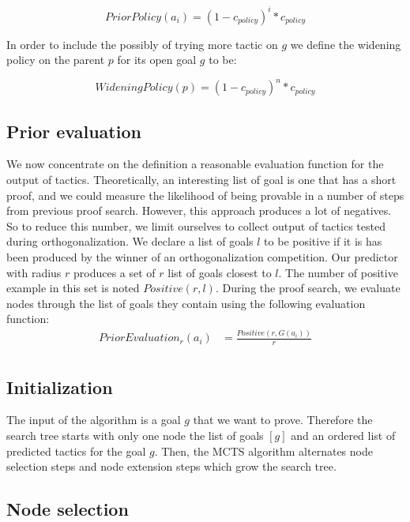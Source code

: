 \documentclass[runningheads,a4paper,draft]{svjour3}
\begin{document}
\[PriorPolicy(a_i) = (1 - c_{policy})^{i} * c_{policy}\]

In order to include the possibly of trying more tactic on $g$ we define the
widening policy on the parent $p$ for its open goal $g$ to be:

\[WideningPolicy(p) = (1 - c_{policy})^{n} * c_{policy}\]


\subsection{Prior evaluation}\label{sec:evaluation}

We now concentrate on the definition a reasonable evaluation function for the
output of tactics. Theoretically, an interesting list of goal is one
that has a short proof, and we could measure the likelihood of being
provable in a number of steps from previous proof search. However, this
approach produces a lot of negatives. So to reduce this number, we limit
ourselves to collect output of tactics tested during orthogonalization. We
declare a list of goals $l$ to be positive if it is has been produced by the
winner of an orthogonalization competition. Our predictor with radius $r$
produces a set of $r$ list of goals
closest to $l$. The
number of positive example in this set is noted $\mathit{Positive}(r,l)$.
During the proof search, we evaluate nodes through the list of goals they
contain using the following evaluation function:
\begin{align*}
\mathit{PriorEvaluation}_r (a_i) &= \frac{\mathit{Positive}(r,G(a_i))}{r}\\
\end{align*}

\subsection{Initialization}
The input of the algorithm is a goal $g$ that we want to prove.
Therefore the search tree starts with only one node the list of goals
$[g]$ and an ordered list of predicted tactics for the goal $g$.
Then, the MCTS algorithm alternates node selection steps and node extension
steps which grow the search tree.

\subsection{Node selection}

\end{document}
